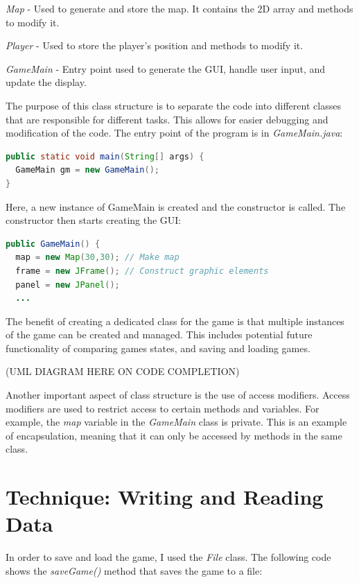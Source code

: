 \documentclass[titlepage]{article}
\begin{document}
\emph{Map} - Used to generate and store the map. It contains the 2D array and methods to modify it.

\emph{Player} - Used to store the player's position and methods to modify it.

\emph{GameMain} - Entry point used to generate the GUI, handle user input, and update the display.

The purpose of this class structure is to separate the code into different classes that are responsible for different tasks. This allows for easier debugging and modification of the code. The entry point of the program is in \emph{GameMain.java}:

\begin{lstlisting}[language=Java]
public static void main(String[] args) {
  GameMain gm = new GameMain();
}
\end{lstlisting}

Here, a new instance of GameMain is created and the constructor is called. The constructor then starts creating the GUI:

\begin{lstlisting}[language=Java]
public GameMain() {
  map = new Map(30,30); // Make map
  frame = new JFrame(); // Construct graphic elements
  panel = new JPanel();
  ...
\end{lstlisting}

The benefit of creating a dedicated class for the game is that multiple instances of the game can be created and managed. This includes potential future functionality of comparing games states, and saving and loading games.

\vspace*{5mm}
(UML DIAGRAM HERE ON CODE COMPLETION)
\vspace*{5mm}

Another important aspect of class structure is the use of access modifiers. Access modifiers are used to restrict access to certain methods and variables. For example, the \emph{map} variable in the \emph{GameMain} class is private. This is an example of encapsulation, meaning that it can only be accessed by methods in the same class.

\pagebreak
\section{Technique: Writing and Reading Data}

In order to save and load the game, I used the \emph{File} class. The following code shows the \emph{saveGame()} method that saves the game to a file:
\end{document}
